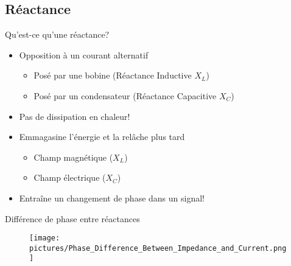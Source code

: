 \subsection{Réactance}
\begin{frame}{Qu'est-ce qu'une réactance?}
    \begin{itemize}
        \item Opposition à un courant alternatif
        \begin{itemize}
            \item Posé par une bobine (Réactance Inductive $X_L$)
            \item Posé par un condensateur (Réactance Capacitive $X_C$)
        \end{itemize}
        \item Pas de dissipation en chaleur!
        \item Emmagasine l'énergie et la relâche plus tard
        \begin{itemize}
            \item Champ magnétique ($X_L$)
            \item Champ électrique ($X_C$)
        \end{itemize}
        \item Entraîne un changement de phase dans un signal!
    \end{itemize}
\end{frame}

\begin{frame}{Différence de phase entre réactances}
    \begin{figure}
        \centering
        \texttt{[image: pictures/Phase\_Difference\_Between\_Impedance\_and\_Current.png]}
    \end{figure}
\end{frame}


